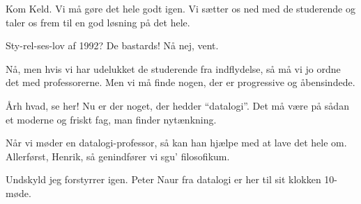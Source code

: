 \documentclass[a4paper,12pt]{article}
\begin{document}
\begin{sketch}
 Kom Keld. Vi må gøre det hele godt igen.  Vi sætter os ned
med de studerende og taler os frem til en god løsning på det hele.


 Sty-rel-ses-lov af 1992? De bastards!  Nå nej, vent.

 Nå, men hvis vi har udelukket de studerende fra indflydelse,
så må vi jo ordne det med professorerne.  Men vi må finde nogen, der
er progressive og åbensindede.

 Årh hvad, se her! Nu er der noget, der hedder ``datalogi''.
Det må være på sådan et moderne og friskt fag, man finder nytænkning.

 Når vi møder en datalogi-professor, så kan han hjælpe med at
lave det hele om.    Allerførst,
Henrik, så genindfører vi sgu' filosofikum.


 Undskyld jeg forstyrrer igen.  Peter Naur fra datalogi er
her til sit klokken 10-møde.


\end{sketch}
\end{document}
